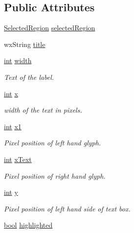 \subsection*{Public Attributes}
\begin{DoxyCompactItemize}
\item 
\hyperlink{class_selected_region}{Selected\+Region} \hyperlink{class_label_struct_ac7eaaf8a91c7f42d33fd0d4d4d8cf56c}{selected\+Region}
\item 
wx\+String \hyperlink{class_label_struct_ab3b60ea3a2f089605a60277c1d7ecab3}{title}
\item 
\hyperlink{xmltok_8h_a5a0d4a5641ce434f1d23533f2b2e6653}{int} \hyperlink{class_label_struct_ae81abfcb1628d7c4931e06f56a319e9f}{width}
\begin{DoxyCompactList}\small\item\em Text of the label. \end{DoxyCompactList}\item 
\hyperlink{xmltok_8h_a5a0d4a5641ce434f1d23533f2b2e6653}{int} \hyperlink{class_label_struct_a3cf92d0baf6b76efa1b16edce3665fb0}{x}
\begin{DoxyCompactList}\small\item\em width of the text in pixels. \end{DoxyCompactList}\item 
\hyperlink{xmltok_8h_a5a0d4a5641ce434f1d23533f2b2e6653}{int} \hyperlink{class_label_struct_a1e7175fc196b30358b92d4bae7f5dad6}{x1}
\begin{DoxyCompactList}\small\item\em Pixel position of left hand glyph. \end{DoxyCompactList}\item 
\hyperlink{xmltok_8h_a5a0d4a5641ce434f1d23533f2b2e6653}{int} \hyperlink{class_label_struct_af7b2252912f4b3999465c8a37c58e30e}{x\+Text}
\begin{DoxyCompactList}\small\item\em Pixel position of right hand glyph. \end{DoxyCompactList}\item 
\hyperlink{xmltok_8h_a5a0d4a5641ce434f1d23533f2b2e6653}{int} \hyperlink{class_label_struct_afebbf0cbb153813c8bd73eb362647736}{y}
\begin{DoxyCompactList}\small\item\em Pixel position of left hand side of text box. \end{DoxyCompactList}\item 
\hyperlink{mac_2config_2i386_2lib-src_2libsoxr_2soxr-config_8h_abb452686968e48b67397da5f97445f5b}{bool} \hyperlink{class_label_struct_a5aa066c2c41f9a807171804bb1ed5db8}{highlighted}

\end{DoxyCompactItemize}
